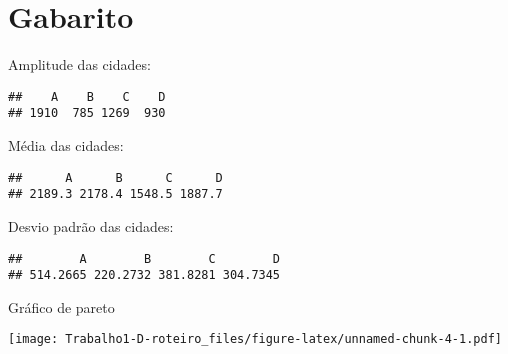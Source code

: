 \documentclass[]{article}
\begin{document}
\section{Gabarito}\label{gabarito}

Amplitude das cidades:

\begin{verbatim}
##    A    B    C    D 
## 1910  785 1269  930
\end{verbatim}

Média das cidades:

\begin{verbatim}
##      A      B      C      D 
## 2189.3 2178.4 1548.5 1887.7
\end{verbatim}

Desvio padrão das cidades:

\begin{verbatim}
##        A        B        C        D 
## 514.2665 220.2732 381.8281 304.7345
\end{verbatim}

Gráfico de pareto

\texttt{[image: Trabalho1-D-roteiro\_files/figure-latex/unnamed-chunk-4-1.pdf]}\\
\end{document}
